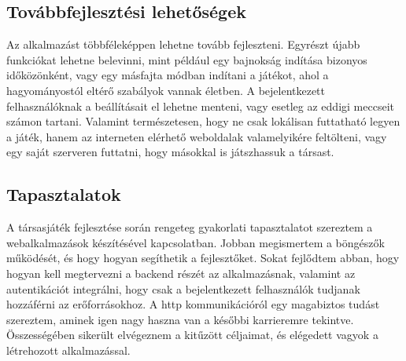 \documentclass[a4paper,twoside]{article}
\begin{document}
\subsection{Továbbfejlesztési lehetőségek}
Az alkalmazást többféleképpen lehetne tovább fejleszteni. Egyrészt újabb funkciókat lehetne belevinni, mint például egy bajnokság indítása bizonyos időközönként, vagy egy másfajta módban indítani a játékot, ahol a hagyományostól eltérő szabályok vannak életben. A bejelentkezett felhasználóknak a  beállításait el lehetne menteni, vagy esetleg az eddigi meccseit számon tartani. Valamint természetesen, hogy ne csak lokálisan futtatható legyen a játék, hanem az interneten elérhető weboldalak valamelyikére feltölteni, vagy egy saját szerveren futtatni, hogy másokkal is játszhassuk a társast. 
\subsection{Tapasztalatok}
A társasjáték fejlesztése során rengeteg gyakorlati tapasztalatot szereztem a webalkalmazások készítésével kapcsolatban. Jobban megismertem a böngészők működését, és hogy hogyan segíthetik a fejlesztőket. Sokat fejlődtem abban, hogy hogyan kell megtervezni a backend részét az alkalmazásnak, valamint az autentikációt integrálni, hogy csak a bejelentkezett felhasználók tudjanak hozzáférni az erőforrásokhoz. A http kommunikációról egy magabiztos tudást szereztem, aminek igen nagy haszna van a későbbi karrieremre tekintve. Összességében sikerült elvégeznem a kitűzött céljaimat, és elégedett vagyok a létrehozott alkalmazással.


\newpage
\end{document}
